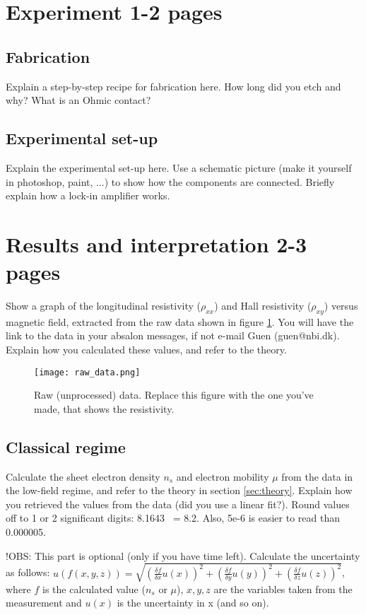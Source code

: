 \documentclass[a4paper]{article}
\begin{document}
\section{Experiment 1-2 pages}
\subsection{Fabrication}
Explain a step-by-step recipe for fabrication here. How long did you etch and why? What is an Ohmic contact?
\subsection{Experimental set-up}
Explain the experimental set-up here. Use a schematic picture (make it yourself in photoshop, paint, ...) to show how the components are connected. Briefly explain how a lock-in amplifier works.

\section{Results and interpretation 2-3 pages}
Show a graph of the longitudinal resistivity ($\rho_{xx}$) and Hall resistivity ($\rho_{xy}$) versus magnetic field, extracted from the raw data shown in figure \ref{fig:data}. You will have the link to the data in your absalon messages, if not e-mail Guen (guen@nbi.dk). Explain how you calculated these values, and refer to the theory.

\begin{figure}
\centering
\texttt{[image: raw\_data.png]}
\caption{\label{fig:data}Raw (unprocessed) data. Replace this figure with the one you've made, that shows the resistivity.}
\end{figure}

\subsection{Classical regime}
Calculate the sheet electron density $n_{s}$ and electron mobility $\mu$ from the data in the low-field regime, and refer to the theory in section \ref{sec:theory}. Explain how you retrieved the values from the data (did you use a linear fit?).
Round values off to 1 or 2 significant digits: 8.1643 ~= 8.2. Also, 5e-6 is easier to read than 0.000005.

!OBS: This part is optional (only if you have time left).
Calculate the uncertainty as follows: \newline $u(f(x, y, z)) = \sqrt{(\frac{\delta f}{\delta{x}} u(x))^{2} + (\frac{\delta f}{\delta{y}} u(y))^{2} + (\frac{\delta f}{\delta{z}} u(z))^{2}}$, where $f$ is the calculated value ($n_{s}$ or $\mu$), $x, y, z$ are the variables taken from the measurement and $u(x)$ is the uncertainty in x (and so on).
\end{document}
